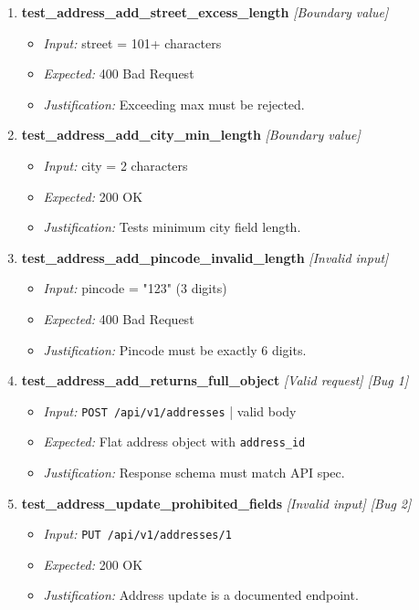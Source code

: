 \documentclass{article}
\begin{document}
\begin{enumerate}[resume, label=\textbf{TC\arabic*.}]
\item \textbf{test\_address\_add\_street\_excess\_length} \textit{[Boundary value]}
\begin{itemize}[noitemsep]
  \item \textit{Input:} street = 101+ characters
  \item \textit{Expected:} 400 Bad Request
  \item \textit{Justification:} Exceeding max must be rejected.
\end{itemize}

\item \textbf{test\_address\_add\_city\_min\_length} \textit{[Boundary value]}
\begin{itemize}[noitemsep]
  \item \textit{Input:} city = 2 characters
  \item \textit{Expected:} 200 OK
  \item \textit{Justification:} Tests minimum city field length.
\end{itemize}

\item \textbf{test\_address\_add\_pincode\_invalid\_length} \textit{[Invalid input]}
\begin{itemize}[noitemsep]
  \item \textit{Input:} pincode = "123" (3 digits)
  \item \textit{Expected:} 400 Bad Request
  \item \textit{Justification:} Pincode must be exactly 6 digits.
\end{itemize}

\item \textbf{test\_address\_add\_returns\_full\_object} \textit{[Valid request] \textit{[Bug 1]}}
\begin{itemize}[noitemsep]
  \item \textit{Input:} \texttt{POST /api/v1/addresses} | valid body
  \item \textit{Expected:} Flat address object with \texttt{address\_id}
  \item \textit{Justification:} Response schema must match API spec.
\end{itemize}

\item \textbf{test\_address\_update\_prohibited\_fields} \textit{[Invalid input] \textit{[Bug 2]}}
\begin{itemize}[noitemsep]
  \item \textit{Input:} \texttt{PUT /api/v1/addresses/1}
  \item \textit{Expected:} 200 OK
  \item \textit{Justification:} Address update is a documented endpoint.
\end{itemize}


\end{enumerate}
\end{document}
